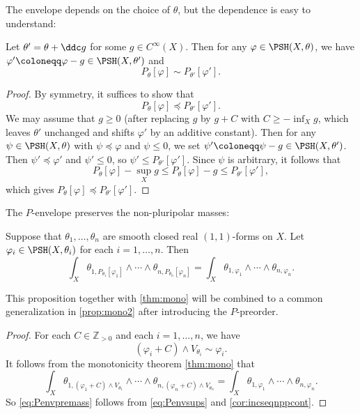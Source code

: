 The envelope depends on the choice of $\theta$, but the dependence is easy to understand:
\begin{proposition}\label{prop:Penvindeptheta}
    Let $\theta'=\theta+\ddc g$ for some $g\in C^{\infty}(X)$. Then for any $\varphi\in \PSH(X,\theta)$, we have $\varphi'\coloneqq \varphi-g\in \PSH(X,\theta')$ and
    \[
        P_{\theta}[\varphi]\sim P_{\theta'}[\varphi'].
    \]
\end{proposition}
\begin{proof}
    By symmetry, it suffices to show that
    \[
        P_{\theta}[\varphi]\preceq P_{\theta'}[\varphi'].
    \]
    We may assume that $g\geq 0$ (after replacing $g$ by $g+C$ with $C\geq -\inf_X g$, which leaves $\theta'$ unchanged and shifts $\varphi'$ by an additive constant).
    Then for any $\psi\in \PSH(X,\theta)$ with $\psi\preceq \varphi$ and $\psi\leq 0$, we set $\psi'\coloneqq \psi-g\in \PSH(X,\theta')$. Then $\psi'\preceq \varphi'$ and $\psi'\leq 0$, so $\psi'\leq P_{\theta'}[\varphi']$. Since $\psi$ is arbitrary, it follows that
    \[
        P_{\theta}[\varphi]-\sup_X g\leq P_{\theta}[\varphi]-g\leq P_{\theta'}[\varphi'],
    \]
    which gives $P_{\theta}[\varphi]\preceq P_{\theta'}[\varphi']$.
\end{proof}

The $P$-envelope preserves the non-pluripolar masses:
\begin{proposition}\label{prop:Ppresmass}
Suppose that $\theta_1,\ldots,\theta_n$ are smooth closed real $(1,1)$-forms on $X$. Let $\varphi_i\in \PSH(X,\theta_i)$ for each $i=1,\ldots,n$. Then
\begin{equation}\label{eq:Penvpremass}
\int_X \theta_{1,P_{\theta_1}[\varphi_1]}\wedge \cdots \wedge \theta_{n,P_{\theta_n}[\varphi_n]}=\int_X \theta_{1,\varphi_1}\wedge \cdots\wedge \theta_{n,\varphi_n}.
\end{equation}
\end{proposition}
This proposition together with \cref{thm:mono} will be combined to a common generalization in \cref{prop:mono2} after introducing the $P$-preorder.
\begin{proof}
For each $C\in \mathbb{Z}_{>0}$ and each $i=1,\ldots,n$, we have
\[
(\varphi_i+C)\land V_{\theta_i}\sim \varphi_i.
\]
It follows from the monotonicity theorem \cref{thm:mono} that
\[
\int_X \theta_{1,(\varphi_1+C)\land V_{\theta_1}}\wedge \cdots \wedge \theta_{n,(\varphi_n+C)\land V_{\theta_n}}=\int_X \theta_{1,\varphi_1}\wedge \cdots\wedge \theta_{n,\varphi_n}.
\]
So \eqref{eq:Penvpremass} follows from \eqref{eq:Penvsups} and \cref{cor:incseqnppcont}.
\end{proof}

